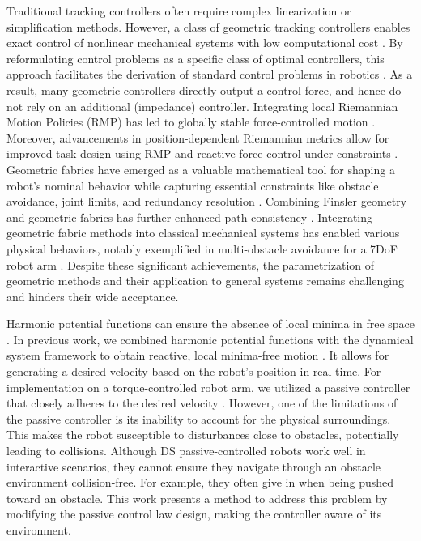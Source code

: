 \iflong
Traditional tracking controllers often require complex linearization or simplification methods. However, a class of geometric tracking controllers enables exact control of nonlinear mechanical systems with low computational cost \parencite{udwadia2003new}. By reformulating control problems as a specific class of optimal controllers, this approach facilitates the derivation of standard control problems in robotics \parencite{peters2008unifying}. As a result, many geometric controllers directly output a control force, and hence do not rely on an additional (impedance) controller.
Integrating local Riemannian Motion Policies (RMP) has led to globally stable force-controlled motion \parencite{cheng2020rmp}. Moreover, advancements in position-dependent Riemannian metrics allow for improved task design using RMP and reactive force control under constraints \parencite{bylard2021composable}.
Geometric fabrics have emerged as a valuable mathematical tool for shaping a robot's nominal behavior while capturing essential constraints like obstacle avoidance, joint limits, and redundancy resolution \parencite{xie2020geometric}. Combining Finsler geometry and geometric fabrics has further enhanced path consistency \parencite{ratliff2021generalized}.
Integrating geometric fabric methods into classical mechanical systems has enabled various physical behaviors, notably exemplified in multi-obstacle avoidance for a 7DoF robot arm \parencite{van2022geometric}. Despite these significant achievements, the parametrization of geometric methods and their application to general systems remains challenging and hinders their wide acceptance.
\fi

Harmonic potential functions can ensure the absence of local minima in free space \parencite{connolly1997harmonic}. In previous work, we combined harmonic potential functions with the dynamical system framework to obtain reactive, local minima-free motion \parencite{huber2019avoidance, huber2023avoidance}. It allows for generating a desired velocity based on the robot's position in real-time.
For implementation on a torque-controlled robot arm, we utilized a passive controller that closely adheres to the desired velocity \parencite{kronander2015passive}. However, one of the limitations of the passive controller is its inability to  account for the physical surroundings. This makes the robot susceptible to disturbances close to obstacles, potentially leading to collisions.
Although DS passive-controlled robots work well in interactive scenarios, they cannot ensure they navigate through an obstacle environment collision-free. For example, they often give in when being pushed toward an obstacle. This work presents a method to address this problem by modifying the passive control law design, making the controller aware of its environment.
